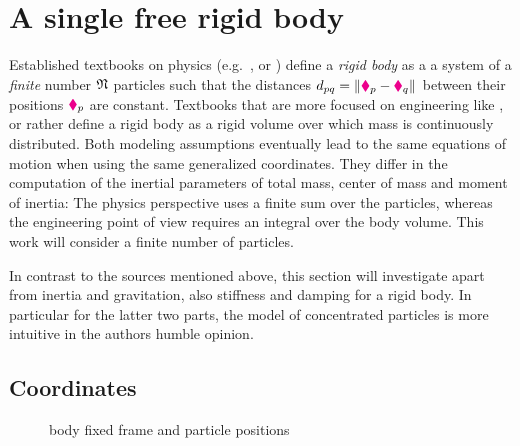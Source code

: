 \clearpage
\section{A single free rigid body}\label{sec:RB}
Established textbooks on physics (e.g.\ \cite[chap. 4]{Goldstein:ClassicalMechanics}, \cite[§31]{Landau:Mechanics} or \cite[§44]{Boltzmann:PrincipeDerMechanik}) define a \textit{rigid body} as a a system of a \textit{finite} number $\mathfrak{N}$ particles such that the distances $d_{pq} = \| \boldsymbol{\textcolor{magenta}{\blacklozenge}}_{p} - \boldsymbol{\textcolor{magenta}{\blacklozenge}}_{q} \|_{}$ between their positions $\boldsymbol{\textcolor{magenta}{\blacklozenge}}_{p}$ are constant.
Textbooks that are more focused on engineering like \cite[sec.\ 8, § 1]{Hamel:TheoretischeMechanik}, \cite[sec.\ 4.1]{Bremer:ElasticMultibodyDynamics} or \cite[sec.\ 6.1.1]{Schwertassek:MultibodySystems} rather define a rigid body as a rigid volume over which mass is continuously distributed.
Both modeling assumptions eventually lead to the same equations of motion when using the same generalized coordinates.
They differ in the computation of the inertial parameters of total mass, center of mass and moment of inertia:
The physics perspective uses a finite sum over the particles, whereas the engineering point of view requires an integral over the body volume.
This work will consider a finite number of particles.

In contrast to the sources mentioned above, this section will investigate apart from inertia and gravitation, also stiffness and damping for a rigid body.
In particular for the latter two parts, the model of concentrated particles is more intuitive in the authors humble opinion.


\subsection{Coordinates}
\begin{figure}[ht]
 \centering
 
 \caption{body fixed frame and particle positions}
 \label{fig:RigidBodyIllustration}
\end{figure}

